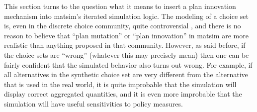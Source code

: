 This section turns to the question what it means to insert a plan
innovation mechanism into \gls{matsim}'s iterated simulation logic. The
modeling of a choice set is, even in the discrete choice community,
quite controversial \citep{frejinger-2010}, and there is no reason
to believe that {}``plan mutation'' or {}``plan innovation'' in
\gls{matsim} are more realistic than anything proposed in that community.
However, as said before, if the choice sets are {}``wrong'' (whatever
this may precisely mean) then one can be fairly confident that the
simulated behavior also turns out wrong.
%
For example, if all alternatives in the synthetic choice set are very different from the alternative that is used in the real world, it is quite improbable that the simulation will display correct aggregated quantities, and it is even more improbable that the simulation will have useful sensitivities to policy measures.



